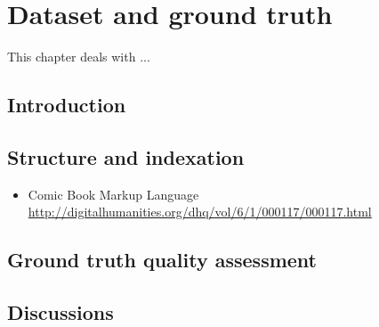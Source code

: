 \chapter{Dataset and ground truth} %
\label{chap:dt}
\graphicspath{{./chapters/9-gt/figs/}}
This chapter\cite{Guerin2013} deals with ...

\section{Introduction}
\label{sec:gt:intro}


\section{Structure and indexation}
\label{sec:gt:structure_indexation}

\begin{itemize}
	\item Comic Book Markup Language \url{http://digitalhumanities.org/dhq/vol/6/1/000117/000117.html}
\end{itemize}

\section{Ground truth quality assessment}
\label{sec:gt:ground_truth_quality_assessment}


\section{Discussions}
\label{sec:gt:siscussions}


